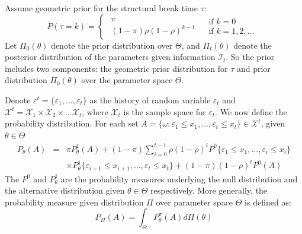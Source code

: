 \documentclass[preprint,authoryear,12pt,english]{elsarticle}
\theoremstyle{plain}
\begin{document}
Assume geometric prior for the structural break time $\tau$:
\begin{equation}\label{eq: geometric_prior}
    P( \tau =k)=\begin{cases}
        \begin{array}{c}
            \pi \\
            (1-\pi)\rho(1-\rho)^{k-1}
        \end{array} & \begin{array}{l}
            \text{if } k=0 \\
            \text{if } k=1,2,...
        \end{array}
    \end{cases}
\end{equation}
Let $\Pi_{0}(\theta)$ denote the prior distribution over $\Theta$, and $\Pi_{t}(\theta)$ denote the posterior distribution of the parameters given information $\mathcal{I}_{t}$. So the prior includes two components: the geometric prior distribution for $\tau$ and prior distribution  $\Pi_{0}(\theta)$ over the parameter space $\Theta$.

Denote $\varepsilon^{t}=\{\varepsilon_{1},...,\varepsilon_{t}\}$ as the history of random variable $\varepsilon_{t}$ and $\mathcal{X}^{t}=\mathcal{X}_{1} \times \mathcal{X}_{2} \times \dotsc \mathcal{X}_{t}$, where $\mathcal{X}_{t}$ is the sample space for $\varepsilon_{t}$.
We now define the probability distribution. For each set $A = \{ \omega \colon \varepsilon_{1}\leq x_{1},...,\varepsilon_{t}\leq x_{t}  \} \in \mathcal{X}^{t}$, given $\theta \in \Theta$
\begin{eqnarray*}
    P_{\theta}(A) &=& \pi P^{1}_{\theta}(A)+(1-\pi)\sum_{i=0}^{t-1} \rho(1-\rho)^{i}P^{0}\{ \varepsilon_{1}\leq x_{1},...,\varepsilon_{i}\leq x_{i} \}\\
    &&\times P^{1}_{\theta}\{ \varepsilon_{i+1}\leq x_{i+1},...,\varepsilon_{t}\leq x_{t} \} + (1-\pi)(1-\rho)^{t}P^{0}(A)
\end{eqnarray*}
The $P^{0}$ and $P^{1}_{\theta}$ are the probability measures underlying the null distribution and the alternative distribution given $\theta \in \Theta$ respectively. More generally, the probability measure given distribution $\Pi$ over parameter space $\Theta$ is defined as:
\begin{equation}
    P_{\Pi}(A) = \int_{\Theta}P^{\pi}_{\theta}(A)d\Pi (\theta)\label{eq:prob measure}
\end{equation}
\end{document}
